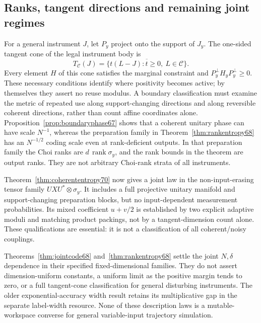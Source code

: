 \subsection{Ranks, tangent directions and remaining joint regimes}
For a general instrument $J$, let $P_y$ project onto the support of
$J_y$. The one-sided tangent cone of the legal instrument body is
\[
 T_{\mathcal C}(J)=\overline{\{t(L-J):t\ge0,\ L\in\mathcal C\}}.
\]
Every element $H$ of this cone satisfies the marginal constraint and
$P_y^\perp H_yP_y^\perp\ge0$. These necessary conditions identify
where positivity becomes active; by themselves they assert no reuse
modulus. A boundary classification must examine the metric of
repeated use along support-changing directions and along reversible
coherent directions, rather than count affine coordinates alone.
Proposition~\ref{prop:boundaryphase67} shows that a coherent unitary
phase can have scale $N^{-1}$, whereas the preparation family in
Theorem~\ref{thm:rankentropy68} has an $N^{-1/2}$ coding scale even
at rank-deficient outputs. In that preparation family the Choi ranks
are $d\,\operatorname{rank}\sigma_y$, and the rank bounds in the
theorem are output ranks. They are not arbitrary Choi-rank strata of
all instruments.

Theorem~\ref{thm:coherententropy70} now gives a joint law in the
non-input-erasing tensor family $UXU^*\otimes\sigma_y$. It includes a
full projective unitary manifold and support-changing preparation blocks,
but no input-dependent measurement probabilities. Its mixed coefficient
$u+v/2$ is established by two explicit adaptive moduli and matching product
packings, not by a tangent-dimension count alone. These qualifications are
essential: it is not a classification of all coherent/noisy couplings.

Theorems~\ref{thm:jointcode68} and~\ref{thm:rankentropy68} settle the
joint $N,\delta$ dependence in their specified fixed-dimensional
families. They do not assert dimension-uniform constants, a uniform
limit as the positive margin tends to zero, or a full tangent-cone
classification for general disturbing instruments. The older
exponential-accuracy width result retains its multiplicative gap in
the separate label-width resource. None of these description laws
is a mutable-workspace converse for general variable-input
trajectory simulation.


